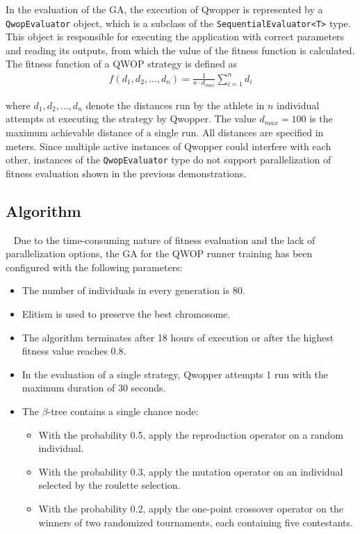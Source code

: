 In the evaluation of the GA, the execution of Qwopper is represented by a \texttt{QwopEvaluator} object, which is a subclass of the \texttt{SequentialEvaluator<T>} type. This object is responsible for executing the application with correct parameters and reading its outputs, from which the value of the fitness function is calculated. The fitness function of a QWOP strategy is defined as
~
\begin{align}
	f(d_1,d_2,\dots,d_n) = \frac{1}{n \cdot d_{max}} \sum_{i=1}^n d_i
\end{align}

\noindent
where $d_1,d_2,\dots,d_n$ denote the distances run by the athlete in $n$ individual attempts at executing the strategy by Qwopper. The value $d_{max}=100$ is the maximum achievable distance of a single run. All distances are specified in meters. Since multiple active instances of Qwopper could interfere with each other, instances of the \texttt{QwopEvaluator} type do not support parallelization of fitness evaluation shown in the previous demonstrations.

\subsection{Algorithm}~\label{section:qwop-algorithm}
Due to the time-consuming nature of fitness evaluation and the lack of parallelization options, the GA for the QWOP runner training has been configured with the following parameters:
~
\begin{itemize}
	\item The number of individuals in every generation is 80.
	\item Elitism is used to preserve the best chromosome.
	\item The algorithm terminates after 18 hours of execution or after the highest fitness value reaches 0.8.
	\item In the evaluation of a single strategy, Qwopper attempts 1 run with the maximum duration of 30 seconds.
	\item The $\beta$-tree contains a single chance node:
	~
	\begin{itemize}
		\item With the probability 0.5, apply the reproduction operator on a random individual.
		\item With the probability 0.3, apply the mutation operator on an individual selected by the roulette selection.
		\item With the probability 0.2, apply the one-point crossover operator on the winners of two randomized tournaments, each containing five contestants.
	\end{itemize}
\end{itemize}

